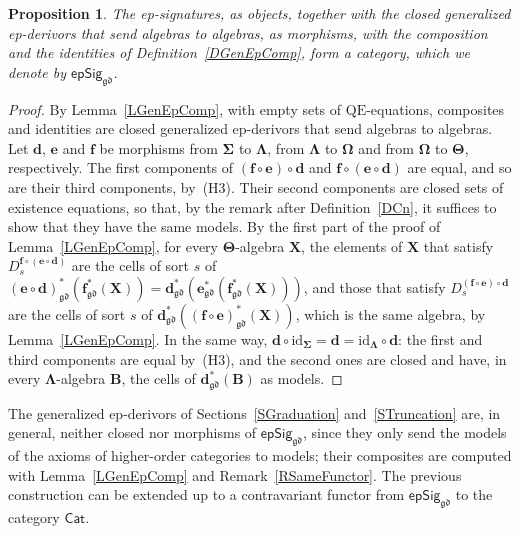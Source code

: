 \documentclass{amsart}
\theoremstyle{plain}
\newtheorem{proposition}[theorem]{Proposition}
\theoremstyle{definition}
\begin{document}
\begin{proposition}\label{PEpSiggdCat}
The ep-signatures, as objects, together with the closed generalized ep-derivors that send algebras to algebras, as morphisms, with the composition and the identities of Definition~\ref{DGenEpComp}, form a category, which we denote by $\mathsf{epSig}_{\mathfrak{gd}}$.
\end{proposition}
\begin{proof}
By Lemma~\ref{LGenEpComp}, with empty sets of $\mathrm{QE}$-equations, composites and identities are closed generalized ep-derivors that send algebras to algebras. Let $\mathbf{d}$, $\mathbf{e}$ and $\mathbf{f}$ be morphisms from $\mathbf{\Sigma}$ to $\mathbf{\Lambda}$, from $\mathbf{\Lambda}$ to $\mathbf{\Omega}$ and from $\mathbf{\Omega}$ to $\mathbf{\Theta}$, respectively. The first components of $(\mathbf{f}\circ\mathbf{e})\circ\mathbf{d}$ and $\mathbf{f}\circ(\mathbf{e}\circ\mathbf{d})$ are equal, and so are their third components, by~(H3). Their second components are closed sets of existence equations, so that, by the remark after Definition~\ref{DCn}, it suffices to show that they have the same models. By the first part of the proof of Lemma~\ref{LGenEpComp}, for every $\mathbf{\Theta}$-algebra $\mathbf{X}$, the elements of $\mathbf{X}$ that satisfy $D^{\mathbf{f}\circ(\mathbf{e}\circ\mathbf{d})}_{s}$ are the cells of sort $s$ of $(\mathbf{e}\circ\mathbf{d})^{\ast}_{\mathfrak{gd}}(\mathbf{f}^{\ast}_{\mathfrak{gd}}(\mathbf{X}))=\mathbf{d}^{\ast}_{\mathfrak{gd}}(\mathbf{e}^{\ast}_{\mathfrak{gd}}(\mathbf{f}^{\ast}_{\mathfrak{gd}}(\mathbf{X})))$, and those that satisfy $D^{(\mathbf{f}\circ\mathbf{e})\circ\mathbf{d}}_{s}$ are the cells of sort $s$ of $\mathbf{d}^{\ast}_{\mathfrak{gd}}((\mathbf{f}\circ\mathbf{e})^{\ast}_{\mathfrak{gd}}(\mathbf{X}))$, which is the same algebra, by Lemma~\ref{LGenEpComp}. In the same way, $\mathbf{d}\circ\mathrm{id}_{\mathbf{\Sigma}}=\mathbf{d}=\mathrm{id}_{\mathbf{\Lambda}}\circ\mathbf{d}$: the first and third components are equal by~(H3), and the second ones are closed and have, in every $\mathbf{\Lambda}$-algebra $\mathbf{B}$, the cells of $\mathbf{d}^{\ast}_{\mathfrak{gd}}(\mathbf{B})$ as models.
\end{proof}

The generalized ep-derivors of Sections~\ref{SGraduation} and~\ref{STruncation} are, in general, neither closed nor morphisms of $\mathsf{epSig}_{\mathfrak{gd}}$, since they only send the models of the axioms of higher-order categories to models; their composites are computed with Lemma~\ref{LGenEpComp} and Remark~\ref{RSameFunctor}. The previous construction can be extended up to a contravariant functor from $\mathsf{epSig}_{\mathfrak{gd}}$ to the category $\mathsf{Cat}$.
\end{document}
